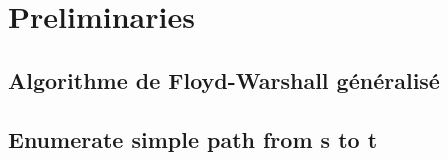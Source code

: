 \section{Preliminaries}

\subsection{Algorithme de Floyd-Warshall généralisé}

\subsection{Enumerate simple path from s to t}
